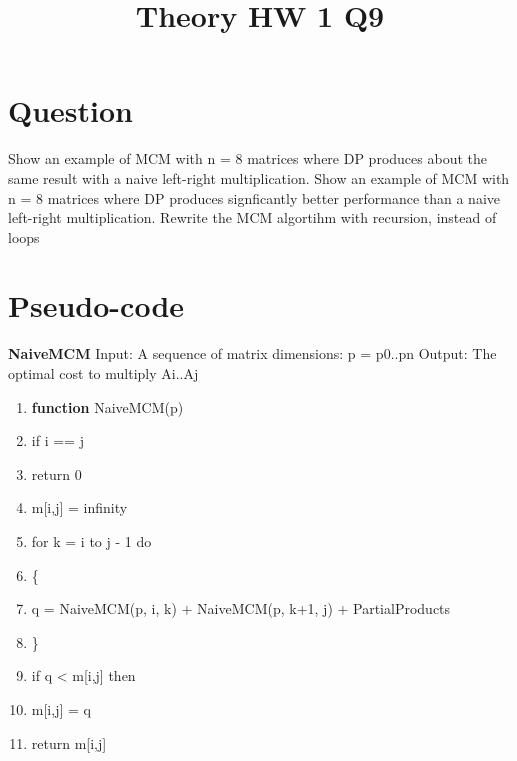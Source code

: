 \documentclass[conference]{IEEEtran}
\begin{document}
\title{Theory HW 1 Q9}

\author{
}

\maketitle

\section{Question}
%
Show an example of MCM with n = 8 matrices where DP produces about the same result with
a naive left-right multiplication.
Show an example of MCM with n = 8 matrices where DP produces signficantly better performance than a naive left-right multiplication.
Rewrite the MCM algortihm with recursion, instead of loops



\section{Pseudo-code}

\textbf{NaiveMCM}
\newline
Input: A sequence of matrix dimensions: p = p0..pn
Output: The optimal cost to multiply Ai..Aj

\begingroup
\renewcommand\labelenumi{\theenumi:}
\begin{enumerate}
\item \textbf{function} NaiveMCM(p)  \label{item:1}
\item if i == j \label{item:2}
\item return 0 \label{item:3}
\item m[i,j] = infinity \label{item:4}
\item for k = i to j - 1 do \label{item:3}
\item \{ \label{item:4}
\item \indent q = NaiveMCM(p, i, k) + NaiveMCM(p, k+1, j) + PartialProducts\label{item:5}
\item \indent \} \label{item:7}
\item \indent if q < m[i,j] then \label{item:7}
\item \indent m[i,j] = q \label{item:8}
\item \indent return m[i,j] \label{item:8}
\end{enumerate}
\endgroup
\end{document}
